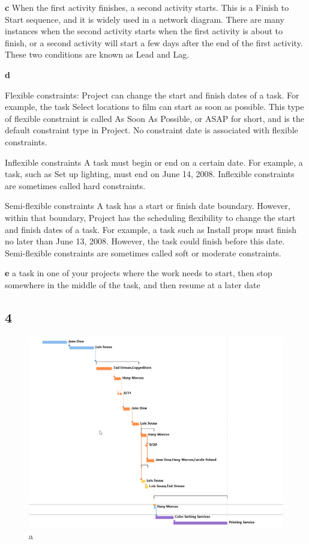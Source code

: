\documentclass[runningheads]{llncs}
\begin{document}
\noindent\textbf{c}
When the first activity finishes, a second activity starts. This is a Finish to Start sequence, and it is widely used in a network diagram. There are many instances when the second activity starts when the first activity is about to finish, or a second activity will start a few days after the end of the first activity. These two conditions are known as Lead and Lag.  

\noindent\textbf{d}

\noindent Flexible constraints: Project can change the start and finish dates of a task. For example, the task Select locations to film can start as soon as possible. This type of flexible constraint is called As Soon As Possible, or ASAP for short, and is the default constraint type in Project. No constraint date is associated with flexible constraints.

\noindent Inflexible constraints A task must begin or end on a certain date. For example, a task, such as Set up lighting, must end on June 14, 2008. Inflexible constraints are sometimes called hard constraints.

\noindent Semi-flexible constraints A task has a start or finish date boundary. However, within that boundary, Project has the scheduling flexibility to change the start and finish dates of a task. For example, a task such as Install props must finish no later than June 13, 2008. However, the task could finish before this date. Semi-flexible constraints are sometimes called soft or moderate constraints.

\noindent\textbf{e}
a task in one of your projects where the work needs to start, then stop somewhere in the middle of the task, and then resume at a later date

\subsection*{4}
\begin{figure}[h]
    \centering
    \includegraphics[width=1.0\textwidth]{image/f0}
    \caption{a}
\end{figure}
\end{document}
